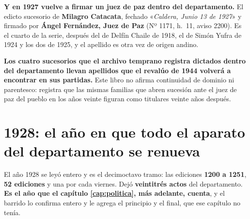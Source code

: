 \begin{cautela}
\textbf{Y en 1927 vuelve a firmar un juez de paz dentro del departamento.} El edicto sucesorio de
\textbf{Milagro Catacata}, fechado «\textit{Caldera, Junio 13 de 1927}» y firmado por
\textbf{Ángel Fernández, Juez de Paz} (Nº 1171, h.\ 11, aviso 2200). Es el cuarto de la serie,
después del de Delfín Chaile de 1918, el de Simón Yufra de 1924 y los dos de 1925, y el apellido es otra vez de origen andino.

\textbf{Los cuatro sucesorios que el archivo temprano registra dictados dentro del departamento
llevan apellidos que el revalúo de 1944 volverá a encontrar en sus partidas.} Este libro no
afirma continuidad de dominio ni parentesco: registra que las mismas familias que abren sucesión
ante el juez de paz del pueblo en los años veinte figuran como titulares veinte años después.
\end{cautela}

\section{1928: el año en que todo el aparato del departamento se renueva}

El año 1928 se leyó entero y es el decimoctavo tramo: las ediciones \textbf{1200 a 1251},
\textbf{52 ediciones} y una por cada viernes. Dejó \textbf{veintitrés actos} del departamento.
\textbf{Es el año que el capítulo \ref{cap:politica}, más adelante, cuenta}, y el barrido lo confirma entero y
le agrega el principio y el final, que ese capítulo no tenía.

